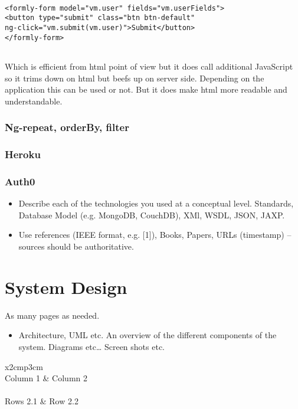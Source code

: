 \begin{verbatim}

<formly-form model="vm.user" fields="vm.userFields">
<button type="submit" class="btn btn-default" 
ng-click="vm.submit(vm.user)">Submit</button>
</formly-form>


\end{verbatim}
\bigbreak

Which is efficient from html point of view but it does call additional JavaScript so it trims down on html but beefs up on server side. Depending on the application this can be used or not. But it does make html more readable and understandable.




\subsection{Ng-repeat, orderBy, filter}
\subsection{Heroku}
\subsection{Auth0}





\begin{itemize}
\item Describe each of the technologies you used at a conceptual level. Standards, Database Model (e.g. MongoDB, CouchDB), XMl, WSDL, JSON, JAXP.
\item Use references (IEEE format, e.g. [1]), Books, Papers, URLs (timestamp) – sources should be authoritative. 
\end{itemize}



\chapter{System Design}
As many pages as needed.
\begin{itemize}
\item Architecture, UML etc. An overview of the different components of the system. Diagrams etc… Screen shots etc.
\end{itemize}

\begin{table}[h]
  \centering
  \begin{tabular}{x{2cm}p{3cm}}
    \toprule \\
    Column 1 & Column 2 \\
    \midrule \\
    Rows 2.1 & Row 2.2 \\
    \bottomrule
  \end{tabular}
  \caption{A table.}
  \label{table:mytable}
\end{table}

